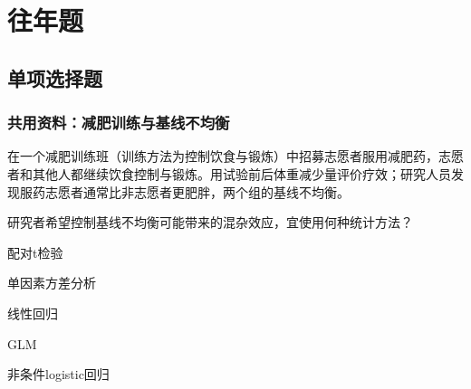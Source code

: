 
\label{chapter:3}

\section{往年题}

\subsection{单项选择题}

\subsubsection*{共用资料：减肥训练与基线不均衡}

在一个减肥训练班（训练方法为控制饮食与锻炼）中招募志愿者服用减肥药，志愿者和其他人都继续饮食控制与锻炼。用试验前后体重减少量评价疗效；研究人员发现服药志愿者通常比非志愿者更肥胖，两个组的基线不均衡。


\par\addvspace{6pt}\noindent\begin{minipage}{\linewidth}


研究者希望控制基线不均衡可能带来的混杂效应，宜使用何种统计方法？


\begin{choices}

\item 配对t检验

\item 单因素方差分析

\item 线性回归

\item GLM

\item 非条件logistic回归

\end{choices}

\end{minipage}\par\vspace{4pt}

